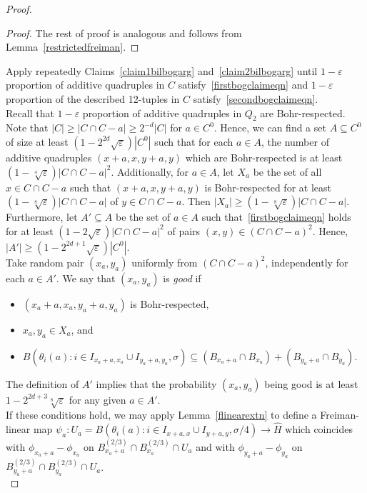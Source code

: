 \documentclass[a4paper,11pt]{article}
\numberwithin{theorem}{section}
\theoremstyle{definition}
\begin{document}
\begin{proof}
\begin{proof}
        The rest of proof is analogous and follows from Lemma~\ref{restrictedfreiman}.
    \end{proof}


    Apply repeatedly Claims~\ref{claim1bilbogarg} and~\ref{claim2bilbogarg} until $1-\varepsilon$ proportion of additive quadruples in $C$  satisfy~\eqref{firstbogclaimeqn} and $1- \varepsilon$ proportion of the described 12-tuples in $C$ satisfy~\eqref{secondbogclaimeqn}.\\

    Recall that $1-\varepsilon$ proportion of additive quadruples in $Q_2$ are Bohr-respected. Note that $|C| \geq |C \cap C - a| \geq 2^{-d}|C|$ for $a \in C^0$. Hence, we can find a set $A \subseteq C^0$ of size at least $(1- 2^{2d}\sqrt{\varepsilon})|C^0|$ such that for each $a \in A$, the number of additive quadruples $(x + a, x, y + a, y)$ which are Bohr-respected is at least $(1-\sqrt[4]{\varepsilon})|C \cap C - a|^2$. Additionally, for $a \in A$, let $X_a$ be the set of all $x \in C \cap C - a$ such that $(x + a, x, y + a, y)$ is Bohr-respected for at least $(1-\sqrt[8]{\varepsilon})|C \cap C - a|$ of $y \in C \cap C - a$. Then $|X_a| \geq (1-\sqrt[8]{\varepsilon})|C \cap C - a|$.\\ 
    \indent Furthermore, let $A' \subseteq A$ be the set of $a \in A$ such that~\eqref{firstbogclaimeqn} holds for at least $(1 - 2\sqrt{\varepsilon})|C \cap C - a|^2$ of pairs $(x,y) \in (C \cap C -a)^2$. Hence, $|A'| \geq (1 - 2^{2d+1}\sqrt{\varepsilon})|C^0|$.\\
    
    Take random pair $(x_a, y_a)$ uniformly from $(C \cap C - a)^2$, independently for each $a \in A'$. We say that $(x_a, y_a)$ is \textit{good} if 
    \begin{itemize}
        \item $(x_a + a, x_a, y_a + a, y_a)$ is Bohr-respected,
        \item $x_a, y_a \in X_a$, and
        \item $B(\theta_i(a) : i \in I_{x_a + a, x_a} \cup I_{y_a + a, y_a}, \sigma) \subseteq (B_{x_a + a} \cap B_{x_a}) + (B_{y_a + a} \cap B_{y_a})$.
    \end{itemize} 
    The definition of $A'$ implies that the probability $(x_a, y_a)$ being good is at least $1 - 2^{2d + 3}\sqrt[8]{\varepsilon}$ for any given $a \in A'$.\\

    If these conditions hold, we may apply Lemma~\ref{flinearextn} to define a Freiman-linear map $\psi_a : U_a = B(\theta_i(a) : i \in I_{x + a, x} \cup I_{y + a, y}, \sigma/4) \to \hat{H}$ which coincides with $\phi_{x_a+a} - \phi_{x_a}$ on $B_{x_a + a}^{(2/3)} \cap B_{x_a}^{(2/3)} \cap U_a$ and with $\phi_{y_a+a} - \phi_{y_a}$ on $B_{y_a + a}^{(2/3)} \cap B_{y_a}^{(2/3)} \cap U_a$.\\


\end{proof}
\end{document}
